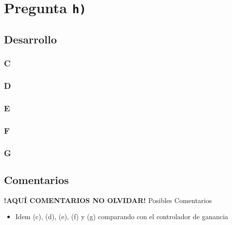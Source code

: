\section{Pregunta \texttt{h)}}\label{pregunta-h}
\subsection{Desarrollo}

\subsubsection{C} %

\FloatBarrier
\subsubsection{D}%

\FloatBarrier
\subsubsection{E}%

\FloatBarrier
\subsubsection{F}%

\FloatBarrier
\subsubsection{G}%


\FloatBarrier
\subsection{Comentarios}


\textbf{!AQUÍ COMENTARIOS NO OLVIDAR!}
Posibles Comentarios
\begin{itemize}
    \item Idem (c), (d), (e), (f) y (g) comparando con el controlador de ganancia
\end{itemize}